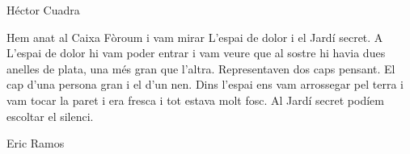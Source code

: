 \begin{news}
Héctor Cuadra

Hem anat al Caixa Fòroum i vam mirar L’espai de dolor i el Jardí secret. A L’espai de dolor hi vam poder entrar i vam veure que al sostre hi havia dues anelles de plata, una més gran que l’altra. Representaven dos caps pensant. El cap d’una persona gran i el d’un nen. Dins l’espai ens vam arrossegar pel terra i vam tocar la paret i era fresca i tot estava molt fosc. Al Jardí secret podíem escoltar el silenci.

Eric Ramos




\end{news}
